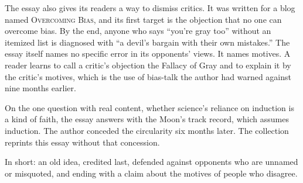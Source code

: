 \begin{afterword}
The essay also gives its readers a way to dismiss critics. It was written for a blog named \textsc{Overcoming Bias}, and its first target is the objection that no one can overcome bias. By the end, anyone who says ``you're gray too'' without an itemized list is diagnosed with ``a devil's bargain with their own mistakes.'' The essay itself names no specific error in its opponents' views. It names motives. A reader learns to call a critic's objection the Fallacy of Gray and to explain it by the critic's motives, which is the use of bias-talk the author had warned against nine months earlier.

On the one question with real content, whether science's reliance on induction is a kind of faith, the essay answers with the Moon's track record, which assumes induction. The author conceded the circularity six months later. The collection reprints this essay without that concession.

In short: an old idea, credited last, defended against opponents who are unnamed or misquoted, and ending with a claim about the motives of people who disagree.
\end{afterword}
